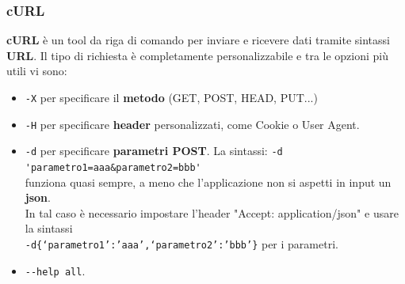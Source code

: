 \documentclass{article}
\begin{document}
\subsubsection{cURL}
\textbf{cURL} è un tool da riga di comando per inviare e ricevere dati tramite sintassi \textbf{URL}. Il tipo di richiesta è completamente personalizzabile e tra le opzioni più utili vi sono:
\begin{itemize}
    \item \verb|-X| per specificare il \textbf{metodo} (GET, POST, HEAD, PUT...)
    \item \verb|-H| per specificare \textbf{header} personalizzati, come  Cookie o User Agent.
    \item \verb|-d| per specificare \textbf{parametri POST}. La sintassi:
    \verb|-d 'parametro1=aaa&parametro2=bbb'|\\
    funziona quasi sempre, a meno che l'applicazione non si aspetti in input un \textbf{json}.\\ In tal caso è necessario impostare l’header "Accept: application/json" e usare la sintassi\\ \verb|-d{‘parametro1’:’aaa’,‘parametro2’:’bbb’}| per i parametri.
    \item \verb|--help all|.
\end{itemize}

\newpage
\end{document}
